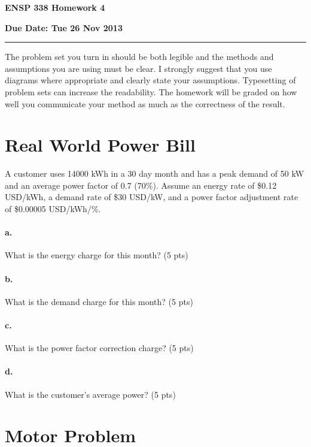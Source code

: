 \documentclass{article}
\newif\ifsolution
\newcommand{\chead}[1]
{\begin{center}\large\textbf{#1}\end{center}}
\newcommand{\solution}[1]
{\ifsolution
\vspace{10pt}
{\color{answer-color} #1}
\else\fi}
\begin{document}
\chead{ENSP 338 Homework 4}
\chead{Due Date:  Tue 26 Nov 2013}
\hrule
\vspace{10pt}

The problem set you turn in should be both legible and the methods and
assumptions you are using must be clear.  I strongly suggest that you
use diagrams where appropriate and clearly state your assumptions.
Typesetting of problem sets can increase the readability.  The homework
will be graded on how well you communicate your method as much as the
correctness of the result.


\section{Real World Power Bill}

A customer uses 14000 kWh in a 30 day month and has a peak demand of 50 kW and an
average power factor of 0.7 (70\%).  Assume an energy rate of \$0.12 USD/kWh, a
demand rate of \$30 USD/kW, and a power factor adjustment rate of
\$0.00005 USD/kWh/\%.

\paragraph{a.} What is the energy charge for this month? (5 pts)

\solution{Energy charges are based on the electrical energy consumed
over the billing time period.
$$14000 kWh \cdot 0.12 USD/kWh = 1680 USD $$}

\paragraph{b.} What is the demand charge for this month? (5 pts)

\solution{Demand charges are based on the highest or peak level of power
consumption over the billing period.
$$ 50 kW peak \cdot 30 USD/kW peak = 1500 USD$$
}

\paragraph{c.} What is the power factor correction charge? (5 pts)


\paragraph{d.} What is the customer's average power? (5 pts)


\section{Motor Problem}
\end{document}
